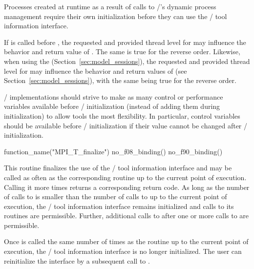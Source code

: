 Processes created at runtime as a result of calls to \MPI/'s dynamic
process management require their own initialization before they can use the
\MPI/ tool information interface.

\begin{users}
If  is called before
, the requested and provided thread level for
 may influence the behavior and return value
of .  The same is true for the reverse order.
Likewise, when using the \spm{} (Section~\ref{sec:model_sessions}), the requested
and provided thread level for  may influence
the behavior and return values of  (see Section~\ref{sec:model_sessions}), with the
same being true for the reverse order.
\end{users}

\begin{implementors}
\MPI/ implementations should strive to make as many control or performance
variables available before \MPI/ initialization (instead of adding them
during initialization) to allow tools the most flexibility.  In
particular, control variables should be available before
\MPI/ initialization if their value cannot be changed after
\MPI/ initialization.
\end{implementors}

\begin{mpi-binding}
    function_name("MPI_T_finalize")
    no_f08_binding()
    no_f90_binding()
\end{mpi-binding}

This routine finalizes the use of the \MPI/ tool information interface and
may be called as often as the corresponding 
routine up to the current point of execution.  Calling it more times
returns a corresponding return code.  As long as the number of calls to
 is smaller than the number of calls to
 up to the current point of execution, the
\MPI/ tool information interface remains initialized and calls to its
routines are permissible.  Further, additional calls to
 after one or more calls to
 are permissible.

Once  is called the same number of times as the
routine  up to the current point of
execution, the \MPI/ tool information interface is no longer initialized.
The user can reinitialize the interface by a subsequent call
to .

